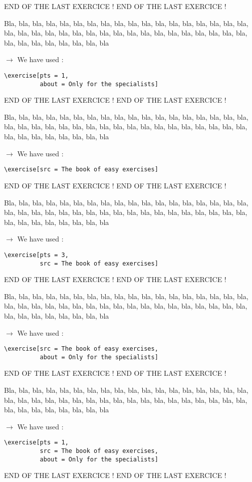 \documentclass[12pt]{article}
\newcommand\blabla{%
		\noindent%
		Bla, bla, bla, bla, bla, bla, bla, bla, bla, bla, bla,
		bla, bla, bla, bla, bla, bla, bla, bla, bla, bla, bla,
		bla, bla, bla, bla, bla, bla, bla, bla, bla, bla, bla,
		bla, bla, bla, bla, bla, bla, bla, bla, bla, bla, bla
	}
\newcommand\codeused{%
		\blabla{} \medskip  \par
		\noindent $\rightarrow$ We have used :
	}
\begin{document}
\newpage \medskip \noindent END OF THE LAST EXERCICE ! END OF THE LAST EXERCICE !

\exercise[pts = 1, about = Only for the specialists]

\codeused{}
\begin{verbatim}
\exercise[pts = 1, 
          about = Only for the specialists]
\end{verbatim}



\newpage \medskip \noindent END OF THE LAST EXERCICE ! END OF THE LAST EXERCICE !

\exercise[src = The book of easy exercises]

\codeused{}
\begin{verbatim}
\exercise[src = The book of easy exercises]
\end{verbatim}



\newpage \medskip \noindent END OF THE LAST EXERCICE ! END OF THE LAST EXERCICE !

\exercise[pts = 3, src = The book of easy exercises]

\codeused{}
\begin{verbatim}
\exercise[pts = 3, 
          src = The book of easy exercises]
\end{verbatim}



\newpage \medskip \noindent END OF THE LAST EXERCICE ! END OF THE LAST EXERCICE !

\exercise[src = The book of easy exercises, about = Only for the specialists]

\codeused{}
\begin{verbatim}
\exercise[src = The book of easy exercises, 
          about = Only for the specialists]
\end{verbatim}



\newpage \medskip \noindent END OF THE LAST EXERCICE ! END OF THE LAST EXERCICE !

\exercise[pts = 1, src = The book of easy exercises, about = Only for the specialists]

\codeused{}
\begin{verbatim}
\exercise[pts = 1, 
          src = The book of easy exercises,
          about = Only for the specialists]
\end{verbatim}


\newpage \medskip \noindent END OF THE LAST EXERCICE ! END OF THE LAST EXERCICE !
\end{document}
